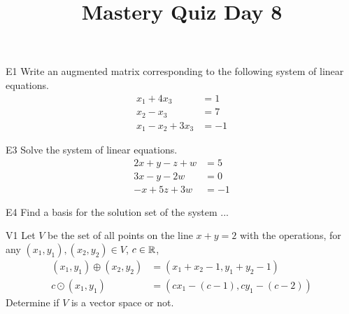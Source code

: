 \documentclass{sbgLAquiz}
\title{Mastery Quiz Day 8 }
\begin{document}
\begin{problem}{E1}
Write an augmented matrix corresponding to the following system of linear equations.
\begin{align*}
x_1+4x_3 &= 1 \\
x_2-x_3 &= 7 \\
x_1-x_2+3x_3 &= -1
\end{align*}
\end{problem}

\begin{problem}{E3}
Solve the system of linear equations.
\begin{align*}
2x+y-z+w &=5 \\
3x-y-2w &= 0 \\
-x+5z+3w&=-1
\end{align*}
\end{problem}
\newpage

\begin{problem}{E4}
Find a basis for the solution set of the system ...
\end{problem}

\begin{problem}{V1}
Let $V$ be the set of all points on the line $x+y=2$ with the operations, for any $(x_1,y_1), (x_2,y_2) \in V$, $c \in \mathbb{R}$,
\begin{align*}
(x_1,y_1) \oplus (x_2,y_2) &= (x_1+x_2-1,y_1+y_2-1) \\
c \odot (x_1,y_1) &= (cx_1-(c-1), cy_1-(c-2))
\end{align*}
Determine if $V$ is a vector space or not.
\end{problem}
\end{document}
